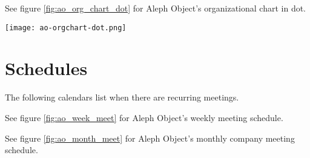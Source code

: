 See figure \ref{fig:ao_org_chart_dot} for Aleph Object's organizational chart in dot.

\begin{sidewaysfigure}[p]
\texttt{[image: ao-orgchart-dot.png]}
 \caption{Aleph Objects Org Chart dot}
 \label{fig:ao_org_chart_dot}
\end{sidewaysfigure}

\section{Schedules}
The following calendars list when there are recurring meetings.


See figure \ref{fig:ao_week_meet} for Aleph Object's weekly meeting schedule.

See figure \ref{fig:ao_month_meet} for Aleph Object's monthly company meeting schedule.
